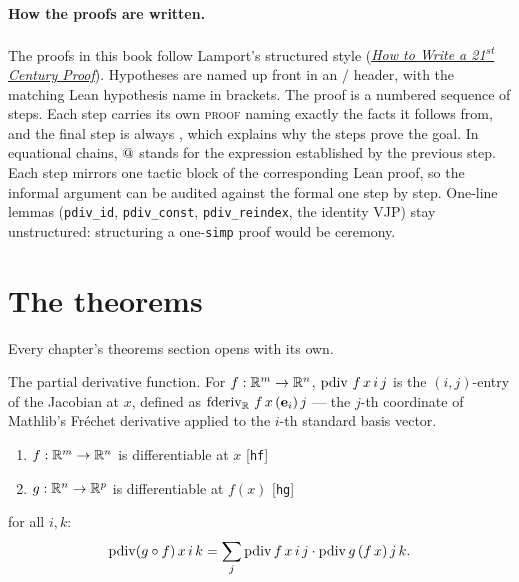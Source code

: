 \paragraph{How the proofs are written.}
The proofs in this book follow Lamport's structured style
(\href{https://lamport.azurewebsites.net/pubs/proof.pdf}{\emph{How to
Write a 21\textsuperscript{st} Century Proof}}).
Hypotheses are named up front in an \Assume{}/\Prove{} header, with the
matching Lean hypothesis name in brackets. The proof is a numbered
sequence of steps. Each step carries its own \textsc{proof} naming
exactly the facts it follows from, and the final step is always \Qed{},
which explains why the steps prove the goal. In equational chains,
\(\mathord{@}\) stands for the expression established by the previous step.
Each step mirrors one tactic block of the corresponding Lean proof, so
the informal argument can be audited against the formal one step by
step. One-line lemmas (\texttt{pdiv\_id}, \texttt{pdiv\_const},
\texttt{pdiv\_reindex}, the identity VJP) stay unstructured:
structuring a one-\texttt{simp} proof would be ceremony.

\section{The theorems}



{\noindent\small \depgraphlegend{} Every chapter's theorems section opens with
its own.\par}

\begin{definition}
  \label{ax:pdiv}
  \leanok
  The partial derivative function. For \(f : \mathbb{R}^{m} \to \mathbb{R}^{n}\),
  \(\operatorname{pdiv}\, f\, x\, i\, j\) is the \((i, j)\)-entry of the Jacobian at \(x\),
  defined as \(\operatorname{fderiv}_{\mathbb{R}}\, f\, x\, (\mathbf{e}_i)\, j\) — the
  \(j\)-th coordinate of Mathlib's Fréchet derivative applied to the
  \(i\)-th standard basis vector.
\end{definition}

\begin{theorem}
  \label{ax:pdiv_comp}
  \leanok
  \Assume{}
  \begin{enumerate}
    \item \(f : \mathbb{R}^{m} \to \mathbb{R}^{n}\) is differentiable at \(x\)
          \hfill[\texttt{hf}]
    \item \(g : \mathbb{R}^{n} \to \mathbb{R}^{p}\) is differentiable at \(f(x)\)
          \hfill[\texttt{hg}]
  \end{enumerate}
  \Prove{} for all \(i, k\):
  \[
    \operatorname{pdiv}(g \circ f)\, x\, i\, k
      = \sum_j \operatorname{pdiv} f\, x\, i\, j \cdot \operatorname{pdiv} g\, (f\, x)\, j\, k.
  \]
\end{theorem}

